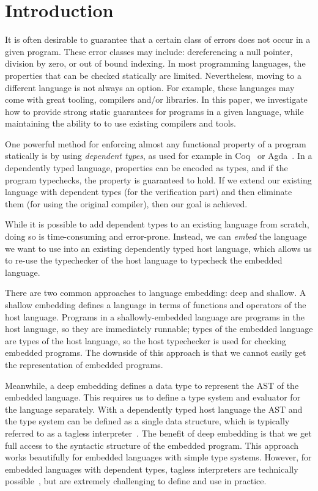 \documentclass[sigplan,screen,anonymous,review]{acmart}
\begin{document}
\section{Introduction}\label{sec:introduction}

It is often desirable to guarantee that a
certain class of errors does not occur in a given program.  These
error classes may include: dereferencing a null pointer, division
by zero, or out of bound indexing.  In most
programming languages, the properties that can be checked
statically are limited.  Nevertheless, moving to a different
language is not always an option.  For example, these languages may
come with great tooling, compilers and/or libraries.  In this paper, we
investigate how to provide strong static guarantees for programs in a
given language, while maintaining the ability to to use existing
compilers and tools.

One powerful method for enforcing almost any functional property of a
program statically is by using \emph{dependent types}, as used for
example in Coq~\cite{Coq-8-13-2} or Agda~\cite{agda-2-6-2}.  In a
dependently typed language, properties can be encoded as types, and if
the program typechecks, the property is guaranteed to hold.  If we
extend our existing language with dependent types (for the verification
part) and then eliminate them (for using the original compiler), then
our goal is achieved.

While it is possible to add dependent types to an existing language
from scratch, doing so is time-consuming and error-prone.  Instead,
we can \emph{embed} the language we want to use into an existing
dependently typed host language, which allows us to re-use the typechecker
of the host language to typecheck the embedded language.

There are two common approaches to language embedding: deep and shallow.
A shallow embedding defines a language in terms of functions and operators
of the host language.  Programs in a shallowly-embedded language are programs
in the host language, so they are immediately runnable; types of the embedded
language are types of the host language, so the host typechecker is used for
checking embedded programs.  The downside of this approach is that we cannot
easily get the representation of embedded programs.

Meanwhile, a deep embedding defines a data type to represent the AST
of the embedded language.  This requires us to define a type system
and evaluator for the language separately.  With a dependently typed
host language the AST and the type system can be defined as a single
data structure, which is typically referred to as a tagless
interpreter~\citep{PasalicTS02}.  The benefit of deep embedding is that we get
full access to the syntactic structure of the embedded program.  This
approach works beautifully for embedded languages with simple type
systems. However, for embedded languages with dependent types, tagless
interpreters are technically
possible~\citep{CHAPMAN200921,10.1007/978-3-540-74464-1_7}, but are
extremely challenging to define and use in practice.
\end{document}
